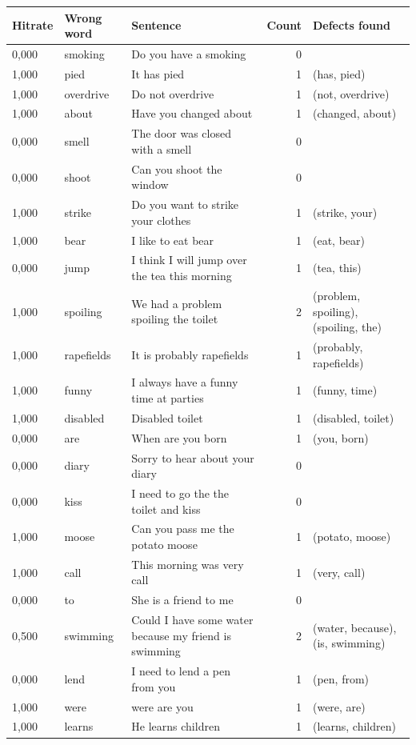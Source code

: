 \documentclass[a4paper,12pt]{article}
\begin{document}
\begin{landscape}
\centering
\begin{longtable}{l l l r l}
Hitrate & Wrong word & Sentence & Count & Defects found \\
\hline
0,000 & smoking & Do you have a smoking & 0 &  \\
1,000 & pied & It has pied & 1 & (has, pied) \\
1,000 & overdrive & Do not overdrive & 1 & (not, overdrive) \\
1,000 & about & Have you changed about & 1 & (changed, about) \\
0,000 & smell & The door was closed with a smell & 0 &  \\
0,000 & shoot & Can you shoot the window & 0 &  \\
1,000 & strike & Do you want to strike your clothes & 1 & (strike, your) \\
1,000 & bear & I like to eat bear & 1 & (eat, bear) \\
0,000 & jump & I think I will jump over the tea this morning & 1 & (tea, this) \\
1,000 & spoiling & We had a problem spoiling the toilet & 2 & (problem, spoiling), (spoiling, the) \\
1,000 & rapefields & It is probably rapefields & 1 & (probably, rapefields) \\
1,000 & funny & I always have a funny time at parties & 1 & (funny, time) \\
1,000 & disabled & Disabled toilet & 1 & (disabled, toilet) \\
0,000 & are & When are you born & 1 & (you, born) \\
0,000 & diary & Sorry to hear about your diary & 0 &  \\
0,000 & kiss & I need to go the the toilet and kiss & 0 &  \\
1,000 & moose & Can you pass me the potato moose & 1 & (potato, moose) \\
1,000 & call & This morning was very call & 1 & (very, call) \\
0,000 & to & She is a friend to me & 0 &  \\
0,500 & swimming & Could I have some water because my friend is swimming & 2 & (water, because), (is, swimming) \\
0,000 & lend & I need to lend a pen from you & 1 & (pen, from) \\
1,000 & were & were are you & 1 & (were, are) \\
1,000 & learns & He learns children & 1 & (learns, children) \\

\end{longtable}
\end{landscape}
\end{document}
